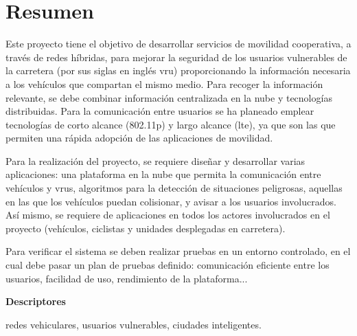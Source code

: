 \chapter*{Resumen}
Este proyecto tiene el objetivo de desarrollar servicios de movilidad
cooperativa, a través de redes híbridas, para mejorar la seguridad de los
usuarios vulnerables de la carretera (por sus siglas en inglés \gls{vru})
proporcionando la información necesaria a los vehículos que compartan el mismo
medio. Para recoger la información relevante, se debe combinar información
centralizada en la nube y tecnologías distribuidas. Para la comunicación entre
usuarios se ha planeado emplear tecnologías de corto alcance (\Gls{802.11p}) y
largo alcance (\gls{lte}), ya que son las que permiten una rápida adopción de
las aplicaciones de movilidad.

Para la realización del proyecto, se requiere diseñar y desarrollar varias
aplicaciones: una plataforma en la nube que permita la comunicación entre
vehículos y \gls{vru}s, algoritmos para la detección de situaciones peligrosas,
aquellas en las que los vehículos puedan colisionar, y avisar a los usuarios
involucrados. Así mismo, se requiere de aplicaciones en todos los actores
involucrados en el proyecto (vehículos, ciclistas y unidades desplegadas en
carretera).

Para verificar el sistema se deben realizar pruebas en un entorno controlado,
en el cual debe pasar un plan de pruebas definido: comunicación eficiente entre
los usuarios, facilidad de uso, rendimiento de la plataforma...

\vspace{2em}

{\Large\bfseries\sectionfont Descriptores}
\vspace{3\medskipamount}

redes vehiculares, usuarios vulnerables, ciudades inteligentes.

\cleardoublepage\tableofcontents
\cleardoublepage\listoffigures
\cleardoublepage\listoftables
\cleardoublepage\listoflistings

\mainmatter
\pagestyle{phdthesis}
